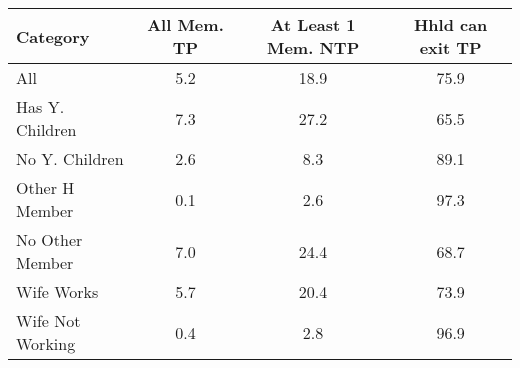 \begin{tabular}{lccc}
\hline\hline
\textbf{Category} & \textbf{All Mem. TP} & \textbf{At Least 1 Mem. NTP} & \textbf{Hhld can exit TP} \\
\hline
All               & 5.2                  & 18.9                         & 75.9                      \\
Has Y. Children    & 7.3                  & 27.2                         & 65.5                      \\
No Y. Children     & 2.6                  & 8.3                          & 89.1                      \\
Other H Member     & 0.1                  & 2.6                          & 97.3                      \\
No Other Member    & 7.0                  & 24.4                         & 68.7                      \\
Wife Works         & 5.7                  & 20.4                         & 73.9                      \\
Wife Not Working   & 0.4                  & 2.8                          & 96.9                      \\
\hline\hline
\end{tabular}

